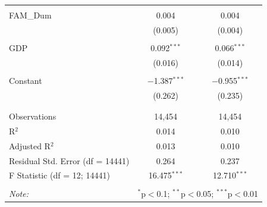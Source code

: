 \documentclass[a4paper]{article}\usepackage[]{graphicx}\usepackage[]{color}
\begin{document}
\begin{table}[!htbp]
\begin{tabular}{@{\extracolsep{5pt}}lcc}
  & & \\ 
 FAM\_Dum & 0.004 & 0.004 \\ 
  & (0.005) & (0.004) \\ 
  & & \\ 
 GDP & 0.092$^{***}$ & 0.066$^{***}$ \\ 
  & (0.016) & (0.014) \\ 
  & & \\ 
 Constant & $-$1.387$^{***}$ & $-$0.955$^{***}$ \\ 
  & (0.262) & (0.235) \\ 
  & & \\ 
\hline \\[-1.8ex] 
Observations & 14,454 & 14,454 \\ 
R$^{2}$ & 0.014 & 0.010 \\ 
Adjusted R$^{2}$ & 0.013 & 0.010 \\ 
Residual Std. Error (df = 14441) & 0.264 & 0.237 \\ 
F Statistic (df = 12; 14441) & 16.475$^{***}$ & 12.710$^{***}$ \\ 
\hline 
\hline \\[-1.8ex] 
\textit{Note:}  & \multicolumn{2}{r}{$^{*}$p$<$0.1; $^{**}$p$<$0.05; $^{***}$p$<$0.01} \\ 
\end{tabular} 
\end{table} 


\newpage
\end{document}
